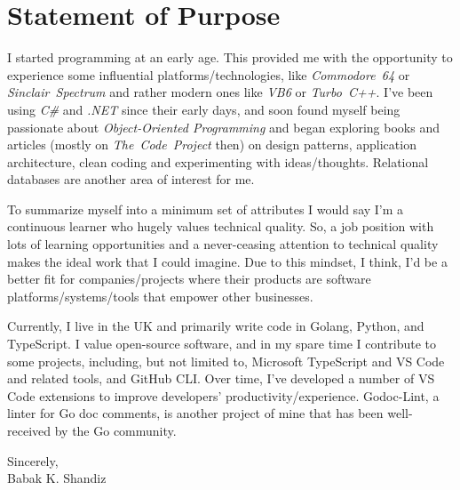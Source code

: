 \documentclass[9pt,a4paper]{extarticle}
\begin{document}


\section*{Statement of Purpose}

I started programming at an early age. This provided me with the opportunity
to experience some influential platforms/technologies, like
\textit{Commodore~64} or \textit{Sinclair~Spectrum} and rather modern ones
like \textit{VB6} or \textit{Turbo~C++}. I've been using \textit{C\#} and
\textit{.NET} since their early days, and soon found myself being passionate
about \textit{Object-Oriented Programming} and began exploring books and
articles (mostly on \textit{The~Code~Project} then) on design patterns,
application architecture, clean coding and experimenting with ideas/thoughts.
Relational databases are another area of interest for me.

To summarize myself into a minimum set of attributes I would say I'm a
continuous learner who hugely values technical quality. So, a job position with
lots of learning opportunities and a never-ceasing attention to technical
quality makes the ideal work that I could imagine. Due to this mindset, I think,
I'd be a better fit for companies/projects where their products are software
platforms/systems/tools that empower other businesses.

Currently, I live in the UK and primarily write code in Golang, Python, and
TypeScript. I value open-source software, and in my spare time I contribute to
some projects, including, but not limited to, Microsoft TypeScript and
VS Code and related tools, and GitHub CLI. Over time, I've developed a number
of VS Code extensions to improve developers' productivity/experience.
Godoc-Lint, a linter for Go doc comments, is another project of mine that has
been well-received by the Go community.

\vspace{2em}
\noindent
Sincerely, \\
\noindent
Babak K. Shandiz
\end{document}

